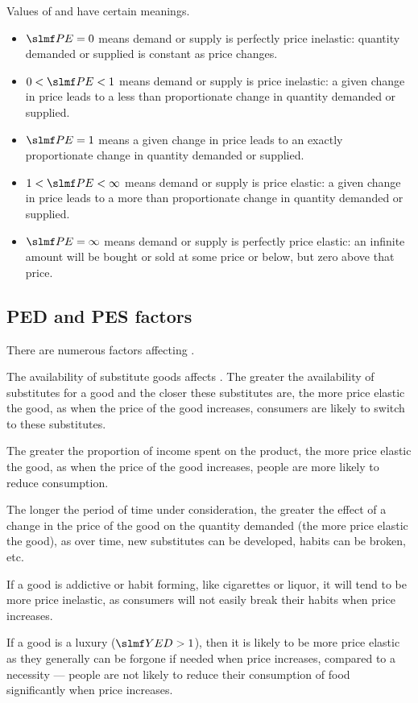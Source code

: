 \documentclass[Economics.tex]{subfiles}
\begin{document}
Values of \PE[S] and \PE[D] have certain meanings.
\begin{itemize}
\item \(\PE = 0\) means demand or supply is perfectly price inelastic: quantity demanded or supplied is constant as price changes.
\item \(0 < \PE < 1\) means demand or supply is price inelastic: a given change in price leads to a less than proportionate change in quantity demanded or supplied.
\item \(\PE = 1\) means a given change in price leads to an exactly proportionate change in quantity demanded or supplied.
\item \(1 < \PE < \infty\) means demand or supply is price elastic: a given change in price leads to a more than proportionate change in quantity demanded or supplied.
\item \(\PE = \infty\) means demand or supply is perfectly price elastic: an infinite amount will be bought or sold at some price or below, but zero above that price.
\end{itemize}
\subsection{PED and PES factors}
There are numerous factors affecting \PE[D].

The availability of substitute goods affects \PE[D]. The greater the availability of substitutes for a good and the closer these substitutes are, the more price elastic the good, as when the price of the good increases, consumers are likely to switch to these substitutes.

The greater the proportion of income spent on the product, the more price elastic the good, as when the price of the good increases, people are more likely to reduce consumption.

The longer the period of time under consideration, the greater the effect of a change in the price of the good on the quantity demanded (the more price elastic the good), as over time, new substitutes can be developed, habits can be broken, etc.

If a good is addictive or habit forming, like cigarettes or liquor, it will tend to be more price inelastic, as consumers will not easily break their habits when price increases.

If a good is a luxury (\(\YED{}> 1\)), then it is likely to be more price elastic as they generally can be forgone if needed when price increases, compared to a necessity --- people are not likely to reduce their consumption of food significantly when price increases.
\end{document}
